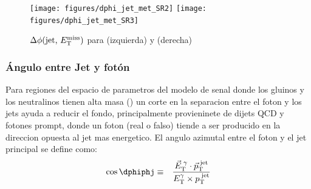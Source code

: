 
\begin{figure}[th!]
 \centering
 \texttt{[image: figures/dphi\_jet\_met\_SR2]}
 \texttt{[image: figures/dphi\_jet\_met\_SR3]}
 \caption{$\Delta \phi \text{(jet, \ensuremath{E_{\mathrm{T}}^{\mathrm{miss}}})}$ para {\SRL} (izquierda) y {\SRH} (derecha)}
 \label{fig:jet-MET-phi_3SR}
\end{figure}

\subsubsection{Ángulo entre Jet y fotón}

Para regiones del espacio de parametros del modelo de senal
donde los gluinos y los neutralinos tienen alta masa ({\SRH})
un corte en la separacion entre el foton y los jets ayuda a
reducir el fondo, principalmente provieninete de dijets QCD y
fotones prompt, donde un foton (real o falso) tiende a ser
producido en la direccion opuesta al jet mas energetico.
El angulo azimutal entre el foton y el jet principal se define
como:
\begin{eqnarray} \label{eq:dphi}
  \cos \dphiphj &\equiv& \frac{\vec{E}_{\rm T}^{\; \gamma} \cdot \vec{p}_{\rm T}^{\rm \; jet}}{{E}_{\rm T}^{\gamma}  \times \pt^{\rm \; jet}}
\end{eqnarray}
%


